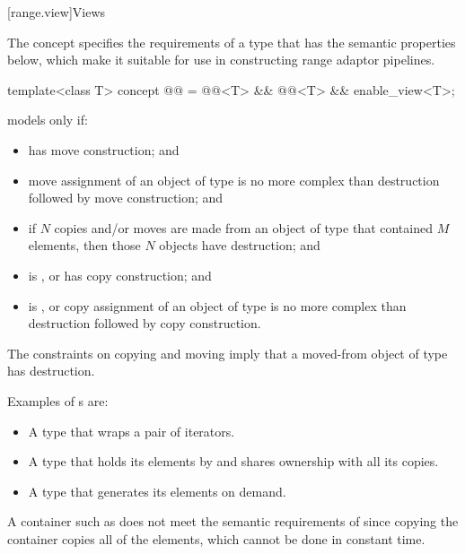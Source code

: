 [range.view]{Views}

\pnum
The  concept specifies the requirements of a  type
that has the semantic properties below,
which make it suitable for use in
constructing range adaptor pipelines.

\begin{itemdecl}
template<class T>
  concept @@ =
    @@<T> && @@<T> && enable_view<T>;
\end{itemdecl}

\begin{itemdescr}
\pnum
{} models  only if:
\begin{itemize}
\item
{} has  move construction; and

\item
move assignment of an object of type 
is no more complex than destruction followed by move construction; and

\item
if $N$ copies and/or moves are made from an object of type 
that contained $M$ elements,
then those $N$ objects have  destruction; and

\item
{} is , or
 has  copy construction; and

\item
{} is , or
copy assignment of an object of type 
is no more complex than destruction followed by copy construction.
\end{itemize}

\pnum
\begin{note}
The constraints on copying and moving imply that
a moved-from object of type  has  destruction.
\end{note}

\pnum
\begin{example}
Examples of s are:
\begin{itemize}
\item A  type that wraps a pair of iterators.

\item A  type that holds its elements by 
and shares ownership with all its copies.

\item A  type that generates its elements on demand.
\end{itemize}

A container such as 
does not meet the semantic requirements of 
since copying the container copies all of the elements,
which cannot be done in constant time.
\end{example}
\end{itemdescr}

